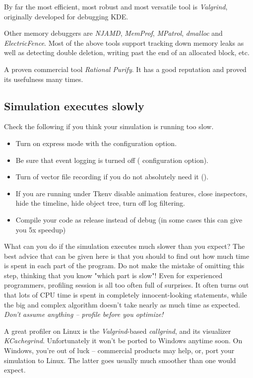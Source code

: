 By far the most efficient, most robust and most versatile tool
is \textit{Valgrind}, originally developed for debugging KDE.

Other memory debuggers are \textit{NJAMD}, \textit{MemProf},
\textit{MPatrol}, \textit{dmalloc} and \textit{ElectricFence}.
Most of the above tools support tracking down memory leaks as well as
detecting double deletion, writing past the end of an allocated block, etc.

A proven commercial tool \textit{Rational Purify}. It has
a good reputation and proved its usefulness many times.

\subsection{Simulation executes slowly}

Check the following if you think your simulation is running too slow.

\begin{itemize}
  \item Turn on express mode with the  configuration option.
  \item Be sure that event logging is turned off ( configuration option).
  \item Turn of vector file recording if you do not absolutely need it ().
  \item If you are running under Tkenv disable animation features, close inspectors,
        hide the timeline, hide object tree, turn off log filtering.
  \item Compile your code as release instead of debug (in some cases this can give you 5x speedup)
\end{itemize}


What can you do if the simulation executes much slower than you expect?
The best advice that can be given here is that you should
 to find out how much time is spent in each
part of the program. Do not make the mistake of omitting this step,
thinking that you know "which part is slow"! Even for experienced
programmers, profiling session is all too often full of surprises.
It often turns out that lots of CPU time is spent in completely
innocent-looking statements, while the big and complex algorithm
doesn't take nearly as much time as expected. \textit{Don't assume anything
-- profile before you optimize!}

A great profiler on Linux is the \textit{Valgrind}-based
\textit{callgrind}, and its visualizer \textit{KCachegrind}.
Unfortunately it won't be ported to Windows anytime soon.
On Windows, you're out of luck -- commercial products may help, or,
port your simulation to Linux. The latter goes usually much smoother
than one would expect.


